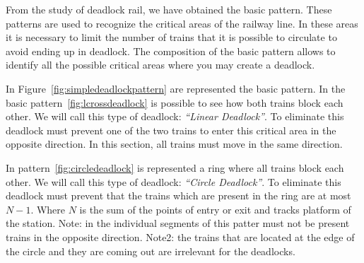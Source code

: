 \documentclass{ewic}
\begin{document}
			From the study of deadlock rail, we have obtained the basic pattern.
			These patterns are used to recognize the critical areas of the railway line. In these areas it is necessary to limit the number of trains that it is possible to circulate to avoid ending up in deadlock.
			The composition of the basic pattern allows to identify all the possible critical areas where you may create a deadlock.
			
			In Figure~\ref{fig:simpledeadlockpattern} are represented the basic pattern.
			In the basic pattern~\ref{fig:lcrossdeadlock} is possible to see how both trains block each other. We will call this type of deadlock: \emph{``Linear Deadlock''}. To eliminate this deadlock must prevent one of the two trains to enter this critical area in the opposite direction. In this section, all trains must move in the same direction.
			
			
			In pattern~\ref{fig:circledeadlock} is represented a ring where all trains block each other. We will call this type of deadlock:  \emph{``Circle Deadlock''}. To eliminate this deadlock must prevent that the trains which are present in the ring are at most $N-1$. Where $N$ is the sum of the points of entry or exit and tracks platform of the station. Note: in the individual segments of this patter must not be present trains in the opposite direction. Note2: the trains that are located at the edge of the circle and they are coming out are irrelevant for the deadlocks.
			
\end{document}
